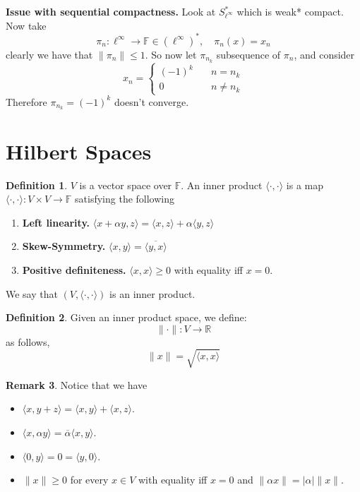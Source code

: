 \documentclass[11pt,a4paper]{article}
\theoremstyle{definition}
\newtheorem{definition}{Definition}[section]
\newtheorem{remark}[definition]{Remark}
\theoremstyle{plain}
\theoremstyle{remark}
\newcommand{\F}{\mathbb{F}}
\newcommand{\R}{\mathbb{R}}
\newcommand{\angles}[1]{\langle #1 \rangle}
\newcommand{\abs}[1]{\lvert #1 \rvert}
\newcommand{\norm}[1]{\lVert #1 \rVert}
\newcommand{\1}{\mathbbm{1}}
\begin{document}
\textbf{Issue with sequential compactness.} Look at $S_{\ell^\infty}^*$ which is weak* compact. Now take 
$$\pi_n \colon \ell^\infty \to \F \in (\ell^\infty)^* , \quad \pi_n(x) = x_n$$
clearly we have that $\norm{\pi_n} \le 1$. So now let $\pi_{n_k}$ subsequence of $\pi_n$, and consider 
$$x_n = \begin{cases}
    (-1)^k \quad &n = n_k \\
    0 \quad & n \ne n_k
\end{cases}$$
Therefore $\pi_{n_k} = (-1)^k$ doesn't converge. 

\section*{Hilbert Spaces}

\begin{definition}
    $V$ is a vector space over $\F$. An inner product $\angles{\cdot, \cdot}$ is a map $\angles{\cdot, \cdot} \colon V \times V \to \F$ satisfying the following 
    \begin{enumerate}[label = \roman*)]
        \item \textbf{Left linearity.} $\angles{x + \alpha y, z} = \angles{x, z} + \alpha \angles{y,z}$ 
        \item \textbf{Skew-Symmetry.} $\angles{x,y} = \overline{\angles{y,x}}$
        \item \textbf{Positive definiteness.} $\angles{x, x} \ge 0$ with equality iff $x = 0$.
    \end{enumerate} 
    We say that $(V, \angles{\cdot, \cdot})$ is an inner product.
\end{definition}

\begin{definition}
    Given an inner product space, we define: 
    $$\norm{\cdot} \colon V \to \R$$ 
    as follows, 
    $$\norm{x} = \sqrt{\angles{x, x}}$$
\end{definition}

\begin{remark}
    Notice that we have 
    \begin{itemize}
        \item $\angles{x, y+z} = \angles{x, y} + \angles{x, z}$.
        \item $\angles{x, \alpha y} = \overline{\alpha} \angles{x, y}$. 
        \item $\angles{0, y} = 0 = \angles{y, 0}$.
        \item $\norm{x} \ge 0$ for every $x \in V$ with equality iff $x = 0$ and $\norm{\alpha x} = \abs{\alpha} \norm{x}$. 
    \end{itemize}    
\end{remark}
\end{document}
